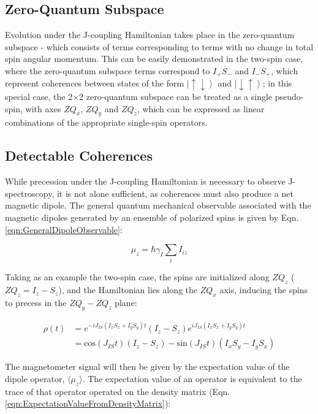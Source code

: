 \documentclass[PaulGanssle-Thesis.tex]{subfiles}
\begin{document}
\subsection{Zero-Quantum Subspace}
\label{nmr.signal.jcoupling.zq}
Evolution under the J-coupling Hamiltonian takes place in the zero-quantum subspace - which consists of terms corresponding to terms with no change in total spin angular momentum. This can be easily demonstrated in the two-spin case, where the zero-quantum subspace terms correspond to $I_{+}S_{-}$ and $I_{-}S_{+}$, which represent coherences between states of the form $\left|\uparrow\downarrow\right\rangle$ and $\left|\downarrow\uparrow\right\rangle$; in this special case, the 2$\times$2 zero-quantum subspace can be treated as a single pseudo-spin, with axes $ZQ_{x}$, $ZQ_{y}$ and $ZQ_{z}$, which can be expressed as linear combinations of the appropriate single-spin operators.

\subsection{Detectable Coherences}
\label{nmr.jcoupling.detection}
While precession under the J-coupling Hamiltonian is necessary to observe J-spectroscopy, it is not alone sufficient, as coherences must also produce a net magnetic dipole. The general quantum mechanical observable associated with the magnetic dipoles generated by an ensemble of polarized spins is given by Eqn. \ref{eqn:GeneralDipoleObservable}:

\begin{equation}
\label{eqn:GeneralDipoleObservable}
\mu_{z} = \hbar\gamma_{I}\sum_{i}I_{iz} 
\end{equation}

Taking as an example the two-spin case, the spins are initialized along $ZQ_{z}$ ($ZQ_{z} = I_z - S_z$), and the Hamiltonian lies along the $ZQ_{x}$ axis, inducing the spins to precess in the $ZQ_{y} - ZQ_{z}$ plane:

\begin{align}
\label{eqn:JCouplingPrecession}
\rho(t) & = e^{-iJ_{IS}(I_{x}S_{x} + I_{y}S_{y})t}(I_{z} - S_{z})e^{iJ_{IS}(I_{x}S_{x} + I_{y}S_{y})t} \nonumber \\
 &= \mathrm{cos}(J_{IS}t)(I_{z} - S_{z}) - \mathrm{sin}(J_{IS}t)(I_{x}S_{y} - I_{y}S_{x})
\end{align}

The magnetometer signal will then be given by the expectation value of the dipole operator, $\langle \mu_{z} \rangle$. The expectation value of an operator is equivalent to the trace of that operator operated on the density matrix (Eqn. \ref{eqn:ExpectationValueFromDensityMatrix}):
\end{document}
